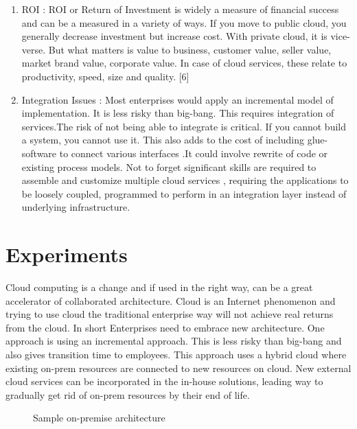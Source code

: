 \documentclass[journal]{hybrid-cloud}
\begin{document}
\begin{enumerate}
	\item ROI : ROI or Return of Investment is widely a measure of financial success and can be a measured in a variety of ways. If you move to public cloud, you generally decrease
investment but increase cost. With private cloud, it is vice-verse. But what matters
is value to business, customer value, seller value, market brand value, corporate value.
In case of cloud services, these relate to productivity, speed, size and quality. [6] 

	\item Integration Issues : Most enterprises would apply an incremental model of implementation. It is less risky than big-bang. This requires integration of services.The risk of not being able to integrate is critical. If you cannot build a system, you cannot use it. This also adds to the cost of including glue-software to connect various interfaces .It could involve rewrite of code or existing process models. Not to forget significant skills are required to assemble and customize multiple cloud services , requiring the applications to be loosely coupled, programmed to perform in an integration layer instead of underlying
infrastructure. 

\end{enumerate}





\section{Experiments }

Cloud computing is a change and if used in the right way, can be a great accelerator
of collaborated architecture. Cloud is an Internet phenomenon and trying to use
cloud the traditional enterprise way will not achieve real returns from the cloud. In
short Enterprises need to embrace new architecture.
One approach is using an incremental approach. This is less risky than big-bang
and also gives transition time to employees. This approach uses a hybrid cloud where
existing on-prem resources are connected to new resources on cloud. New external
cloud services can be incorporated in the in-house solutions, leading way to gradually
get rid of on-prem resources by their end of life.


\begin{figure}[h]
	\caption{Sample on-premise architecture}%
	\label{fig:Sample_on-premise_Architecture}
\end{figure}
\end{document}
